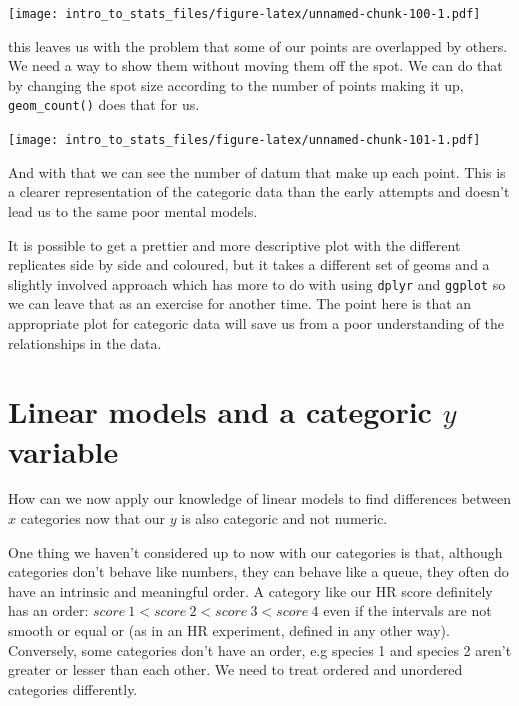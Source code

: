 \documentclass[
]{book}
\newenvironment{Shaded}{\begin{snugshade}}{\end{snugshade}}
\newcommand{\KeywordTok}[1]{\textcolor[rgb]{0.13,0.29,0.53}{\textbf{#1}}}
\newcommand{\NormalTok}[1]{#1}
\newcommand{\OperatorTok}[1]{\textcolor[rgb]{0.81,0.36,0.00}{\textbf{#1}}}
\newcommand{\StringTok}[1]{\textcolor[rgb]{0.31,0.60,0.02}{#1}}
\begin{document}
\texttt{[image: intro\_to\_stats\_files/figure-latex/unnamed-chunk-100-1.pdf]}

this leaves us with the problem that some of our points are overlapped by others. We need a way to show them without moving them off the spot. We can do that by changing the spot size according to the number of points making it up, \texttt{geom\_count()} does that for us.

\begin{Shaded}
\end{Shaded}

\texttt{[image: intro\_to\_stats\_files/figure-latex/unnamed-chunk-101-1.pdf]}

And with that we can see the number of datum that make up each point. This is a clearer representation of the categoric data than the early attempts and doesn't lead us to the same poor mental models.

It is possible to get a prettier and more descriptive plot with the different replicates side by side and coloured, but it takes a different set of geoms and a slightly involved approach which has more to do with using \texttt{dplyr} and \texttt{ggplot} so we can leave that as an exercise for another time. The point here is that an appropriate plot for categoric data will save us from a poor understanding of the relationships in the data.

\hypertarget{linear-models-and-a-categoric-y-variable}{%
\section{\texorpdfstring{Linear models and a categoric \(y\) variable}{Linear models and a categoric y variable}}\label{linear-models-and-a-categoric-y-variable}}

How can we now apply our knowledge of linear models to find differences between \(x\) categories now that our \(y\) is also categoric and not numeric.

One thing we haven't considered up to now with our categories is that, although categories don't behave like numbers, they can behave like a queue, they often do have an intrinsic and meaningful order. A category like our HR score definitely has an order: \(score\ 1 < score\ 2 < score\ 3 < score\ 4\) even if the intervals are not smooth or equal or (as in an HR experiment, defined in any other way). Conversely, some categories don't have an order, e.g species 1 and species 2 aren't greater or lesser than each other. We need to treat ordered and unordered categories differently.
\end{document}
